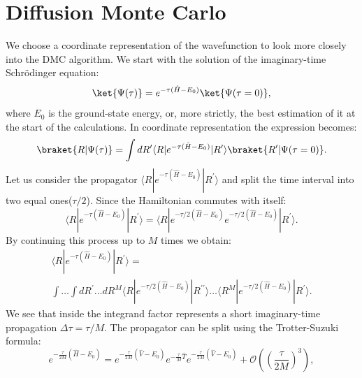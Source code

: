 \documentclass[twoside,english]{uiofysmaster}
\begin{document}
\section{Diffusion Monte Carlo}
We choose a coordinate representation of the wavefunction to look more closely into the DMC algorithm.%
We start with the solution of the imaginary-time Schr\"{o}dinger equation:
\begin{equation}\label{SEsolutionpropagator1}
\ket{\Psi(\tau)}= e^{-\tau (\hat{H} - E_0)}\ket{\Psi(\tau = 0)},
\end{equation}
where $E_0$ is the ground-state energy, or, more strictly, the best estimation of it at the start of the calculations. In coordinate representation the expression becomes:
\begin{equation}\label{SEsolutionpropagator2}
\braket{R|\Psi(\tau)}= \int dR^{\prime} \langle R|e^{-\tau (\hat{H} - E_0)}|R^{\prime}\rangle \braket{R^{\prime}|\Psi(\tau = 0)}.
\end{equation}
Let us consider the propagator $\langle R|e^{-\tau (\hat{H} -
	E_0)}|R^{\prime}\rangle$ and split the time interval into two equal
ones($\tau/2$). Since the Hamiltonian commutes with itself:
\begin{equation}\label{SEsolutionpropagator3}
\langle R|e^{-\tau (\hat{H} - E_0)}|R^{\prime}\rangle = \langle R|e^{-\tau/2 (\hat{H} - E_0)}e^{-\tau/2 (\hat{H} - E_0)}|R^{\prime}\rangle.
\end{equation}
By continuing this process up to $M$ times we obtain:
\begin{align}\label{SEsolutionpropagator4}
\langle R|e^{-\tau (\hat{H} - E_0)}|R^{\prime}\rangle =\\
\int \dots \int dR^{\prime} \dots dR^M \langle R|e^{-\tau/2 (\hat{H} - E_0)}|R^{\prime\prime}\rangle \dots \langle R^M|e^{-\tau/2 (\hat{H} - E_0)}|R^{\prime}\rangle.
\end{align}
We see that inside the integrand factor represents a short
imaginary-time propagation $\Delta \tau = \tau/M$. The propagator can
be split using the Trotter-Suzuki formula:
\begin{equation}\label{SEsolutionpropagator5}
e^{- \frac{\tau}{2M} (\hat{H} - E_0)} = e^{-\frac{\tau}{2M} (\hat{V} - E_0)} e^{-\frac{\tau}{M} \hat{T}} e^{-\frac{\tau}{2M} (\hat{V} - E_0)} + \mathcal{O}((\frac{\tau}{2M})^3),
\end{equation}
\end{document}
